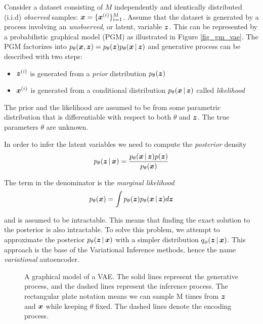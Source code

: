Consider a dataset consisting of $M$ independently and identically distributed (i.i.d) \textit{observed} samples: $\boldsymbol{x} = \{\boldsymbol{x}^{(i)}\}^M_{i=1}$. Assume that the dataset is generated by a process involving an \textit{unobserved}, or latent, variable $\boldsymbol{z}$. This can be represented by a probabilistic graphical model (PGM) as illustrated in Figure \ref{fig_gm_vae}. The PGM factorizes into $\ptheta (\vx, \vz) = \ptheta (\vz) \ptheta \given{\vx}{\vz}$ and generative process can be described with two steps:

\begin{itemize}
    \item $\boldsymbol{z}^{(i)}$ is generated from a \textit{prior} distribution $p_{\theta}(\boldsymbol{z})$
    \item $\boldsymbol{x}^{(i)}$ is generated from a conditional distribution $p_{\theta}\given{\vx}{\vz}$ called \textit{likelihood}
\end{itemize}
%
The prior and the likelihood are assumed to be from some parametric distribution that is differentiable with respect to both $\theta$ and $\boldsymbol{z}$. The true parameters $\theta$ are unknown.

In order to infer the latent variables we need to compute the \textit{posterior} density
\begin{equation}
p_{\theta}\given{\vz}{\vx} = \frac{p_{\theta}\given{\vx}{\vz}p(\vz)}{p_{\theta}(\vx)}
\end{equation}

The term in the denominator is the \emph{marginal likelihood}
\begin{equation}
p_{\theta}(\vx) = \int p_{\theta}(\vz)p_{\theta}\given{\vx}{\vz} d\vz
\label{eq:maximize_vae}
\end{equation}

and is assumed to be intractable. This means that finding the exact solution to the posterior is also intractable. To solve this problem, we attempt to approximate the posterior $\ptheta \given{\vz}{\vx}$ with a simpler distribution $\qphi \given{\vz}{\vx}$. This approach is the base of the Variational Inference methods, hence the name \textit{variational} autoencoder.

\begin{figure}
\centering
{}
\caption{A graphical model of a VAE. The solid lines represent the generative process, and the dashed lines represent the inference process. The rectangular plate notation means we can sample M times from $\boldsymbol{z}$ and $\boldsymbol{x}$ while keeping $\theta$ fixed. The dashed lines denote the encoding process.}
\end{figure}

